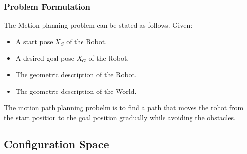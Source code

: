 \documentclass{beamer}
\begin{document}
\begin{frame}
\frametitle{Problem Formulation}
The Motion planning problem can be stated as follows. Given:
\begin{itemize}
\item A start pose $X_S$ of the Robot.
\item A desired goal pose $X_G$ of the Robot.
\item The geometric description of the Robot.
\item The geometric description of the World.
\end{itemize}\vspace{.5cm}

The motion path planning probelm is to find a path that moves the robot from the start position to the goal position gradually while avoiding the obstacles.

\end{frame}
\subsection{Configuration Space}
\end{document}
